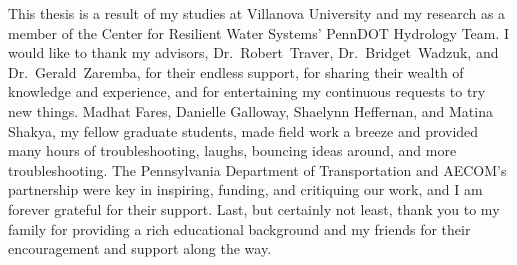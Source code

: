 This thesis is a result of my studies at Villanova University and my research as a member of the Center for Resilient Water Systems' PennDOT Hydrology Team. I would like to thank my advisors, Dr.~Robert~Traver, Dr.~Bridget~Wadzuk, and Dr.~Gerald~Zaremba, for their endless support, for sharing their wealth of knowledge and experience, and for entertaining my continuous requests to try new things. Madhat Fares, Danielle Galloway, Shaelynn Heffernan, and Matina Shakya, my fellow graduate students, made field work a breeze and provided many hours of troubleshooting, laughs, bouncing ideas around, and more troubleshooting. The Pennsylvania Department of Transportation and AECOM's partnership were key in inspiring, funding, and critiquing our work, and I am forever grateful for their support. Last, but certainly not least, thank you to my family for providing a rich educational background and my friends for their encouragement and support along the way.
